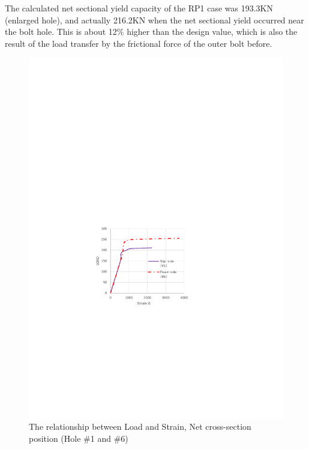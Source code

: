 The calculated net sectional yield capacity of the RP1 case was 193.3KN (enlarged hole), and actually 216.2KN when the net sectional yield occurred near the bolt hole. This is about 12\% higher than the design value, which is also the result of the load transfer by the frictional force of the outer bolt before.

\begin{figure}[htbp]
    \centering
    \begin{minipage}[t]{0.48\textwidth}
    \includegraphics[width=\linewidth]{imgs/ch3/fig3-19.pdf}
    \caption{The relationship between Load and Strain, Net cross-section position (Hole \#1 and \#6)}
    \label{fig3-19}
    \end{minipage}
    \begin{minipage}[t]{0.48\textwidth}

\end{minipage}
\end{figure}
